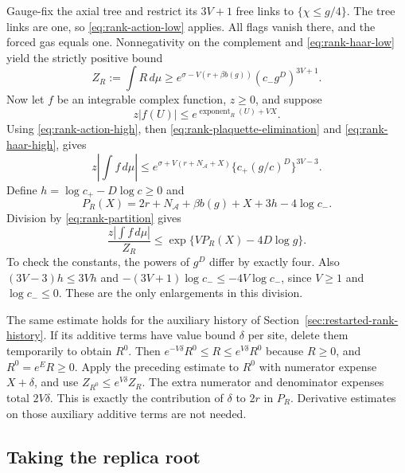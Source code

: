 Gauge-fix the axial tree and restrict its $3V+1$ free links to
$\{\chi\le g/4\}$. The tree links are one, so
\eqref{eq:rank-action-low} applies. All flags vanish there, and the
forced gas equals one. Nonnegativity on the complement and
\eqref{eq:rank-haar-low} yield the strictly positive bound
\begin{equation}\label{eq:rank-partition}
 Z_R:=\int R\,d\mu\ge
 e^{\sigma-V(r+\beta b(g))}(c_-g^D)^{3V+1}.
\end{equation}
Now let $f$ be an integrable complex function, $z\ge0$, and suppose
\[
 z|f(U)|\le e^{\operatorname{exponent}_R(U)+VX}.
\]
Using \eqref{eq:rank-action-high}, then
\eqref{eq:rank-plaquette-elimination} and
\eqref{eq:rank-haar-high}, gives
\[
 z\left|\int f\,d\mu\right|
 \le e^{\sigma+V(r+N_{\mathcal A}+X)}
             \{c_+(g/c)^D\}^{3V-3}.
\]
Define $h=\log c_+-D\log c\ge0$ and
\[
 P_R(X)=2r+N_{\mathcal A}+\beta b(g)+X+3h-4\log c_-.
\]
Division by \eqref{eq:rank-partition} gives
\begin{equation}\label{eq:rank-ratio}
 \frac{z|\int f\,d\mu|}{Z_R}
       \le \exp\{VP_R(X)-4D\log g\}.
\end{equation}
To check the constants, the powers of $g^D$ differ by exactly four.
Also $(3V-3)h\le3Vh$ and
$-(3V+1)\log c_-\le-4V\log c_-$, since $V\ge1$ and
$\log c_-\le0$. These are the only enlargements in this division.

The same estimate holds for the auxiliary history of
Section~\ref{sec:restarted-rank-history}. If its additive terms have
value bound $\delta$ per site, delete them temporarily to obtain $R^0$.
Then $e^{-V\delta}R^0\le R\le e^{V\delta}R^0$ because $R\ge0$,
and $R^0=e^ER\ge0$. Apply the preceding estimate to $R^0$ with
numerator expense $X+\delta$, and use
$Z_{R^0}\le e^{V\delta}Z_R$. The extra numerator and denominator
expenses total $2V\delta$. This is exactly the contribution of
$\delta$ to $2r$ in $P_R$. Derivative estimates on those auxiliary
additive terms are not needed.

\subsection{Taking the replica root}

